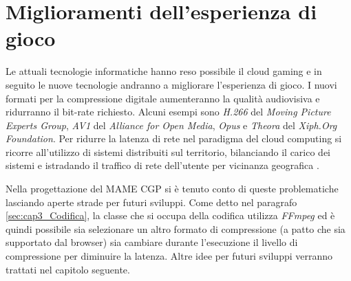 \section{Miglioramenti dell'esperienza di gioco} \label{sec:cap4_ProgressiTech}
Le attuali tecnologie informatiche hanno reso possibile il cloud gaming e in seguito le nuove tecnologie andranno a migliorare l'esperienza di gioco. I nuovi formati per la compressione digitale aumenteranno la qualità audiovisiva e ridurranno il bit-rate richiesto. Alcuni esempi sono \textit{H.266} del \textit{Moving Picture Experts Group}, \textit{AV1} del \textit{Alliance for Open Media}, \textit{Opus} e \textit{Theora} del \textit{Xiph.Org Foundation}. Per ridurre la latenza di rete nel paradigma del cloud computing si ricorre all'utilizzo di sistemi distribuiti sul territorio, bilanciando il carico dei sistemi e istradando il traffico di rete dell'utente per vicinanza geografica \parencite{sun_2019}.

Nella progettazione del MAME CGP si è tenuto conto di queste problematiche lasciando aperte strade per futuri sviluppi. Come detto nel paragrafo \ref{sec:cap3_Codifica}, la classe che si occupa della codifica utilizza \textit{FFmpeg} ed è quindi possibile sia selezionare un altro formato di compressione (a patto che sia supportato dal browser) sia cambiare durante l'esecuzione il livello di compressione per diminuire la latenza. Altre idee per futuri sviluppi verranno trattati nel capitolo seguente.